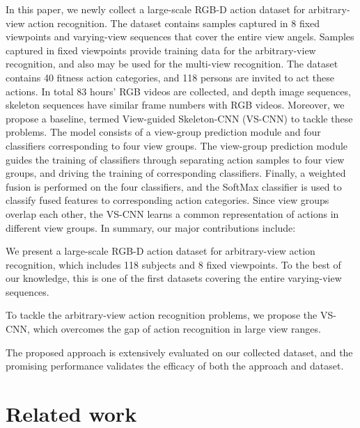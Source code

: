 \documentclass[journal]{IEEEtran}
\begin{document}
In this paper, we newly collect a large-scale RGB-D action dataset for arbitrary-view action recognition. The dataset contains samples captured in 8 fixed viewpoints and varying-view sequences that cover the entire  view angels. Samples captured in fixed viewpoints provide training data for the arbitrary-view recognition, and also may be used for the multi-view recognition. The dataset contains 40 fitness action categories, and 118 persons are invited to act these actions. In total 83 hours' RGB videos are collected, and depth image sequences, skeleton sequences have similar frame numbers with RGB videos.
Moreover, we propose a baseline, termed View-guided Skeleton-CNN (VS-CNN) to tackle these problems. The model consists of a view-group prediction module and four classifiers corresponding to four view groups. The view-group prediction module guides the training of classifiers through separating action samples to four view groups, and driving the training of corresponding classifiers. Finally, a weighted fusion is performed on the four classifiers, and the SoftMax classifier is used to classify fused features to corresponding action categories. Since view groups overlap each other, the VS-CNN learns a common representation of actions in different view groups. In summary, our major contributions include:


We present a large-scale RGB-D action dataset for arbitrary-view action recognition, which includes 118 subjects and 8 fixed viewpoints. To the best of our knowledge, this is one of the first datasets covering the entire  varying-view sequences.


To tackle the arbitrary-view action recognition problems, we propose the VS-CNN, which overcomes the gap of action recognition in large view ranges.


The proposed approach is extensively evaluated on our collected dataset, and the promising performance validates the efficacy of both the approach and dataset.


\section{Related work}
\label{sec:relatedWork}
\end{document}
